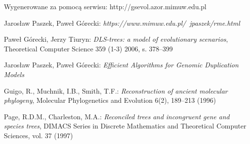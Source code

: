 \documentclass[licencjacka]{pracamgr}
\begin{document}
\begin{thebibliography}{99}

 Wygenerowane za pomocą serwisu: http://gsevol.azor.mimuw.edu.pl 

 Jarosław Paszek, Paweł Górecki: \textit{https://www.mimuw.edu.pl/~jpaszek/rme.html}
  
 Paweł Górecki, Jerzy Tiuryn: \textit{DLS-trees: a model of evolutionary scenarios}, Theoretical Computer Science 359 (1-3) 2006, s. 378–399

 Jarosław Paszek, Paweł Górecki: \textit{Efficient Algorithms for Genomic Duplication Models}

Guigo, R., Muchnik, I.B., Smith, T.F.: \textit{Reconstruction of ancient molecular phylogeny}, Molecular Phylogenetics and Evolution 6(2), 189–213 (1996)

Page, R.D.M., Charleston, M.A.: \textit{Reconciled trees and incongruent gene and species trees}, DIMACS Series in Discrete Mathematics and Theoretical Computer Sciences, vol. 37 (1997)

\end{thebibliography}
\end{document}
